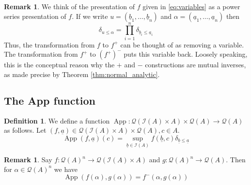 \documentclass[12pt]{article}
\theoremstyle{plain}
\theoremstyle{definition}
\newtheorem{defn}[thm]{Definition} %
\newtheorem{remark}[thm]{Remark}
\newcommand{\call}[1]{\mathcal{#1}}
\newcommand{\Ical}{\call{I}}
\newcommand{\Qcal}{\call{Q}}
\newcommand{\lto}{\longrightarrow}
\begin{document}
	\begin{remark}
		We think of the presentation of $f$ given in \eqref{eq:variables} as a power series presentation of $f$. If we write $u = (\underline{b}_1, \ldots, \underline{b}_n)$ and $\alpha = (\underline{a}_1, \ldots, \underline{a}_n)$ then
		\begin{equation}
			\delta_{u \leq \alpha} = \prod_{i = 1}^n \delta_{\underline{b}_i \leq \underline{a}_i}
		\end{equation}
		Thus, the transformation from $f$ to $f^+$ can be thought of as removing a variable. The transformation from $f^+$ to $(f^+)^-$ puts this variable back. Loosely speaking, this is the conceptual reason why the $+$ and $-$ constructions are mutual inverses, as made precise by Theorem \ref{thm:normal_analytic}.
	\end{remark}
	
	\subsection{The App function}
	
	\begin{defn}
		We define a function $\operatorname{App}: \Qcal(\Ical(A) \times A) \times \Qcal(A) \lto \Qcal(A)$ as follows. Let $(f, \underline{a}) \in \Qcal(\Ical(A) \times A) \times \Qcal(A), c \in A$.
		\begin{equation}
			\operatorname{App}(f,\underline{a})(c) = \operatorname{sup}_{\underline{b} \in \Ical(A)}f(\underline{b},c)\delta_{\underline{b} \leq \underline{a}}
			\end{equation}
		\end{defn}
	
	\begin{remark}
		Say $f: \Qcal(A)^n \lto \Qcal(\Ical(A) \times A)$ and $g: \Qcal(A)^n \lto \Qcal(A)$. Then for $\alpha \in \Qcal(A)^n$ we have
		\begin{equation}
			\operatorname{App}(f(\alpha), g(\alpha))= f^-(\alpha, g(\alpha))
			\end{equation}
		\end{remark}
	
\end{document}
